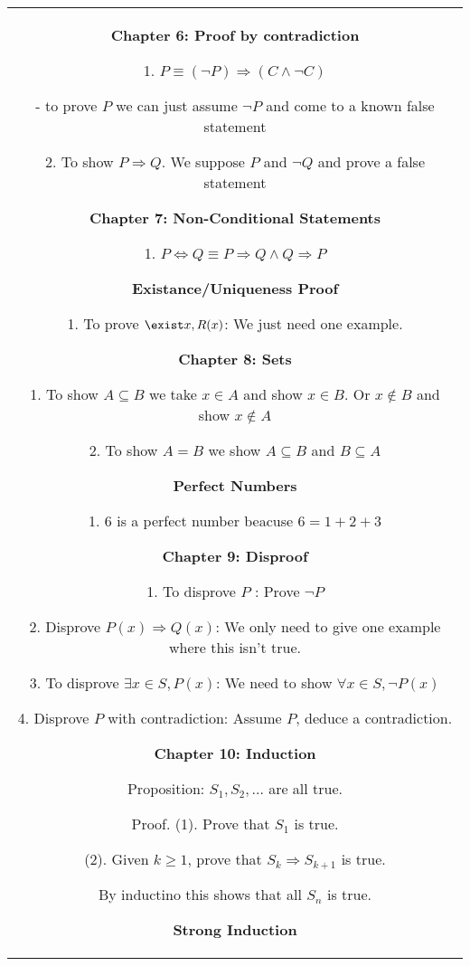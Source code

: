 \documentclass[a4paper]{article}
\begin{document}
    \begin{tabular}{@{}c@{}}
    \begin{minipage}[t][\paperheight][t]{0.49\paperwidth}%
        \textbf{Chapter 6: Proof by contradiction}

        1. $P \equiv (\neg P) \Rightarrow (C \land \neg C)$ 
        
        \quad - to prove $P$ we can just assume $\neg P$ and come to a known false statement

        2. To show $P \Rightarrow Q$. We suppose  $P$ and  $\neg Q$ and prove a false statement

        \textbf{Chapter 7: Non-Conditional Statements}

        1. $P \iff Q \equiv P \Rightarrow Q \land Q \Rightarrow P$

        \textbf{Existance/Uniqueness Proof}

        1. To prove $\exist x, R(x)$: We just need one example.
        
        \textbf{Chapter 8: Sets}

        1. To show $A \subseteq B$ we take $x \in A$ and show  $x \in B$. Or  $x \notin B$ and show  $x \notin A$ 

        2. To show $A = B$ we show  $A \subseteq B$ and  $B \subseteq A$

        \textbf{Perfect Numbers}

        1. 6 is a perfect number beacuse  $6 = 1 + 2 + 3$

        \textbf{Chapter 9: Disproof}

        1. To disprove  $P$ : Prove $\neg P$

        2. Disprove  $P(x) \Rightarrow Q(x)$: We only need to give one example where this isn't true.

        3. To disprove  $\exists x \in S, P(x)$: We need to show  $\forall x \in S, \neg P(x)$

        4. Disprove  $P$ with contradiction: Assume $P$, deduce a contradiction.

        \textbf{Chapter 10: Induction}

        Proposition: $S_1,S_2,\dots$ are all true.

        Proof. (1). Prove that $S_1$ is true.

        (2). Given $k \ge 1$, prove that  $S_k \Rightarrow S_{k+1}$ is true.

        By inductino this shows that all $S_n$ is true.

        \textbf{Strong Induction}


\end{minipage}
\end{tabular}
\end{document}
